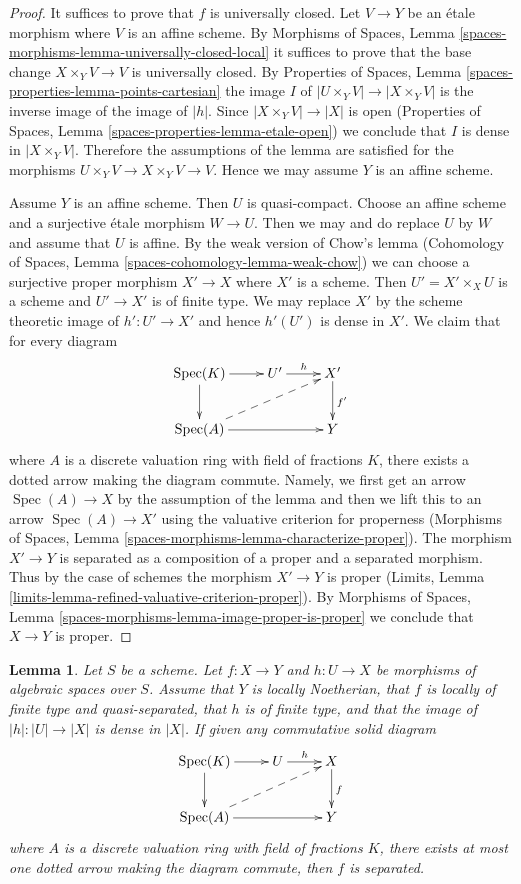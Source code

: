 \documentclass{stacks-project}
\theoremstyle{plain}
\newtheorem{lemma}[subsection]{Lemma}
\theoremstyle{definition}
\theoremstyle{remark}
\numberwithin{equation}{subsection}
\def\Spec{\mathop{\mathrm{Spec}}}
\begin{document}
\begin{proof}
It suffices to prove that $f$ is universally closed.
Let $V \to Y$ be an \'etale morphism where $V$ is an affine scheme.
By Morphisms of Spaces, Lemma
\ref{spaces-morphisms-lemma-universally-closed-local}
it suffices to prove that the base change $X \times_Y V \to V$ is
universally closed. By Properties of Spaces, Lemma
\ref{spaces-properties-lemma-points-cartesian}
the image $I$ of $|U \times_Y V| \to |X \times_Y V|$
is the inverse image of the image of $|h|$. Since
$|X \times_Y V| \to |X|$ is open
(Properties of Spaces, Lemma \ref{spaces-properties-lemma-etale-open})
we conclude that $I$ is dense in $|X \times_Y V|$.
Therefore the assumptions of the lemma are
satisfied for the morphisms $U \times_Y V \to X \times_Y V \to V$.
Hence we may assume $Y$ is an affine scheme.

\medskip\noindent
Assume $Y$ is an affine scheme. Then $U$ is quasi-compact. Choose
an affine scheme and a surjective \'etale morphism $W \to U$.
Then we may and do replace $U$ by $W$ and assume that $U$ is affine.
By the weak version of Chow's lemma
(Cohomology of Spaces, Lemma \ref{spaces-cohomology-lemma-weak-chow})
we can choose a surjective proper morphism $X' \to X$
where $X'$ is a scheme. Then $U' = X' \times_X U$ is a scheme
and $U' \to X'$ is of finite type. We may replace $X'$ by
the scheme theoretic image of $h' : U' \to X'$ and hence $h'(U')$
is dense in $X'$. We claim that for every diagram
$$
\xymatrix{
\Spec(K) \ar[r] \ar[d] & U' \ar[r]^h & X' \ar[d]^{f'} \\
\Spec(A) \ar[rr] \ar@{-->}[rru] & & Y
}
$$
where $A$ is a discrete valuation ring with field of fractions $K$, there
exists a dotted arrow making the diagram commute. Namely, we first get an
arrow $\Spec(A) \to X$ by the assumption of the lemma and then we lift this
to an arrow $\Spec(A) \to X'$ using the valuative criterion for properness
(Morphisms of Spaces, Lemma \ref{spaces-morphisms-lemma-characterize-proper}).
The morphism $X' \to Y$ is separated
as a composition of a proper and a separated morphism.
Thus by the case of schemes the morphism $X' \to Y$ is proper
(Limits, Lemma
\ref{limits-lemma-refined-valuative-criterion-proper}).
By Morphisms of Spaces, Lemma
\ref{spaces-morphisms-lemma-image-proper-is-proper}
we conclude that $X \to Y$ is proper.
\end{proof}

\begin{lemma}
\label{lemma-refined-valuative-criterion-separated}
Let $S$ be a scheme. Let $f : X \to Y$ and $h : U \to X$ be
morphisms of algebraic spaces over $S$. Assume that $Y$ is
locally Noetherian, that $f$ is locally of finite type and quasi-separated,
that $h$ is of finite type, and that the image of $|h| : |U| \to |X|$
is dense in $|X|$.
If given any commutative solid diagram
$$
\xymatrix{
\Spec(K) \ar[r] \ar[d] & U \ar[r]^h & X \ar[d]^f \\
\Spec(A) \ar[rr] \ar@{-->}[rru] & & Y
}
$$
where $A$ is a discrete valuation ring with field of fractions $K$, there
exists at most one dotted arrow making the diagram commute, then $f$ is
separated.
\end{lemma}
\end{document}
